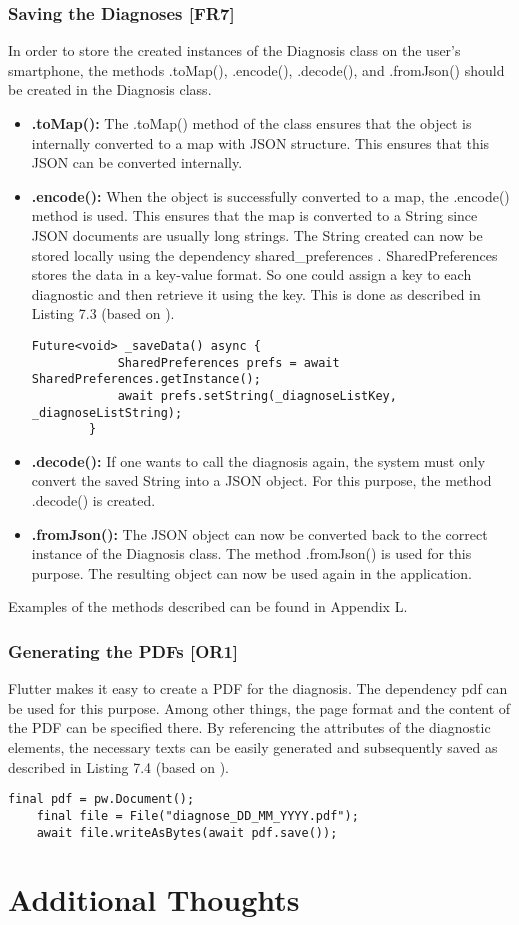 \subsubsection{Saving the Diagnoses [FR7]}
In order to store the created instances of the Diagnosis class on the user's smartphone, the methods .toMap(), .encode(), .decode(), and .fromJson() should be created in the Diagnosis class.
\begin{itemize}
	\item \textbf{.toMap():}
	\newline
	The .toMap() method of the class ensures that the object is internally converted to a map with JSON structure. This ensures that this JSON can be converted internally.
	\item \textbf{.encode():}
	\newline
	When the object is successfully converted to a map, the .encode() method is used. This ensures that the map is converted to a String since JSON documents are usually long strings. 
	The String created can now be stored locally using the dependency shared\_preferences \cite{.sharedpref}. SharedPreferences stores the data in a key-value format. So one could assign a key to each diagnostic and then retrieve it using the key. This is done as described in Listing 7.3 (based on \cite{.usesharedpref}). 
	\scriptsize
	\begin{lstlisting}[caption=Storing Data to Locally with SharedPreferences]
		Future<void> _saveData() async {
			SharedPreferences prefs = await SharedPreferences.getInstance();
			await prefs.setString(_diagnoseListKey, _diagnoseListString);
		}
	\end{lstlisting}
	\normalsize
	\item \textbf{.decode():}
	\newline
	If one wants to call the diagnosis again, the system must only convert the saved String into a JSON object. For this purpose, the method .decode() is created. 
	\item \textbf{.fromJson():}
	\newline
	The JSON object can now be converted back to the correct instance of the Diagnosis class. The method .fromJson() is used for this purpose. The resulting object can now be used again in the application.
\end{itemize}
Examples of the methods described can be found in Appendix L.
\subsubsection{Generating the PDFs [OR1]}
Flutter makes it easy to create a PDF for the diagnosis. The dependency pdf can be used for this purpose. Among other things, the page format and the content of the PDF can be specified there. By referencing the attributes of the diagnostic elements, the necessary texts can be easily generated and subsequently saved as described in Listing 7.4 (based on \cite{.pdf}).
\scriptsize
\begin{lstlisting}[caption=Saving a PDF]
	final pdf = pw.Document();
	final file = File("diagnose_DD_MM_YYYY.pdf");
	await file.writeAsBytes(await pdf.save());
\end{lstlisting}
\normalsize

\section{Additional Thoughts}


